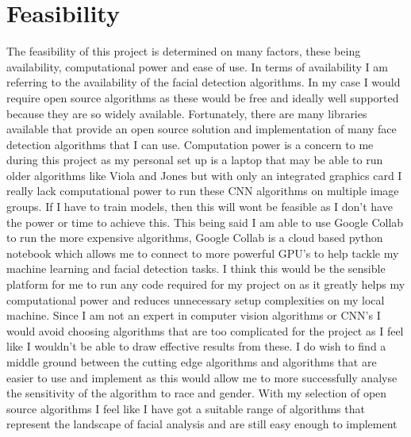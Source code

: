 \documentclass{article}
\begin{document}
\section{Feasibility}
The feasibility of this project is determined on many factors, these being availability,
computational power and ease of use.
In terms of availability I am referring to the availability of the facial detection algorithms. In
my case I would require open source algorithms as these would be free and ideally well
supported because they are so widely available. Fortunately, there are many libraries
available that provide an open source solution and implementation of many face detection
algorithms that I can use.
\newline \newline
Computation power is a concern to me during this project as my personal set up is a laptop
that may be able to run older algorithms like Viola and Jones but with only an integrated
graphics card I really lack computational power to run these CNN algorithms on multiple
image groups. If I have to train models, then this will wont be feasible as I don’t have the
power or time to achieve this. This being said I am able to use Google Collab to run the more
expensive algorithms, Google Collab is a cloud based python notebook which allows me to
connect to more powerful GPU’s to help tackle my machine learning and facial detection
tasks. I think this would be the sensible platform for me to run any code required for my 
project on as it greatly helps my computational power and reduces unnecessary setup
complexities on my local machine.
\newline \newline
Since I am not an expert in computer vision algorithms or CNN’s I would avoid choosing
algorithms that are too complicated for the project as I feel like I wouldn’t be able to draw
effective results from these. I do wish to find a middle ground between the cutting edge
algorithms and algorithms that are easier to use and implement as this would allow me to
more successfully analyse the sensitivity of the algorithm to race and gender. With my
selection of open source algorithms I feel like I have got a suitable range of algorithms that
represent the landscape of facial analysis and are still easy enough to implement
\end{document}
